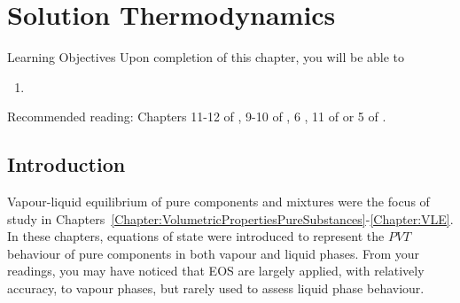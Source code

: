 \chapter{Solution Thermodynamics}\label{Chapter:SolutionThermodynamics}


   \begin{LearningObjectivesBlock}{Learning Objectives}
      Upon completion of this chapter, you will be able to
        \begin{enumerate}
           \item 
        \end{enumerate}
\medskip
     Recommended reading: Chapters 11-12 of \citet{SmithVanNess_Book}, 9-10 of \cite{Sandler_Book}, 6 \citet{Lue_Book}, 11 of \citet{Elliot_Book} or 5 of \citet{Atkins_Book}.
   \end{LearningObjectivesBlock}


\begin{comment}
   \begin{LearningObjectivesBlock}{Learning Objectives}
      Upon completion of this chapter, you will be able to
        \begin{enumerate}
           \item {\bf Knowledge:} Define, Name, Select, State 
           \item {\bf Comprehension:} Describe, Identify, Discuss
           \item {\bf Application:} Apply, Demonstrate, Employ, Sketch
           \item {\bf Analysis:} Analyse, Compare, Calculate, Solve
           \item {\bf Synthesis:} Determine, Formulate
           \item {\bf Evaluation:} Assess, Check, Estimate, Compare, Measure, Monitor
        \end{enumerate}
\end{comment}

\localtableofcontents
   


\section{Introduction}\label{Chapter:SolutionThermodynamics:Section:Introduction}
Vapour-liquid equilibrium of pure components and mixtures were the focus of study in Chapters~\ref{Chapter:VolumetricPropertiesPureSubstances}-\ref{Chapter:VLE}. In these chapters, equations of state were introduced to represent the $PVT$ behaviour of pure components in both vapour and liquid phases. From your readings, you may have noticed that EOS are largely applied, with relatively accuracy, to vapour phases, but rarely used to assess liquid phase behaviour. 

